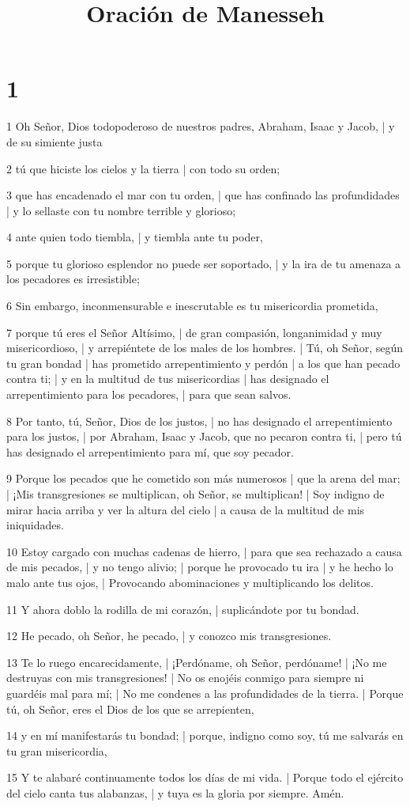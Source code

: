 

\title{Oración de Manesseh}

\chapter{1}

\par 1 Oh Señor, Dios todopoderoso de nuestros padres, Abraham, Isaac y Jacob, | y de su simiente justa
\par 2 tú que hiciste los cielos y la tierra | con todo su orden;
\par 3 que has encadenado el mar con tu orden, | que has confinado las profundidades | y lo sellaste con tu nombre terrible y glorioso;
\par 4 ante quien todo tiembla, | y tiembla ante tu poder,
\par 5 porque tu glorioso esplendor no puede ser soportado, | y la ira de tu amenaza a los pecadores es irresistible;
\par 6 Sin embargo, inconmensurable e inescrutable es tu misericordia prometida,
\par 7 porque tú eres el Señor Altísimo, | de gran compasión, longanimidad y muy misericordioso, | y arrepiéntete de los males de los hombres. | Tú, oh Señor, según tu gran bondad | has prometido arrepentimiento y perdón | a los que han pecado contra ti; | y en la multitud de tus misericordias | has designado el arrepentimiento para los pecadores, | para que sean salvos.
\par 8 Por tanto, tú, Señor, Dios de los justos, | no has designado el arrepentimiento para los justos, | por Abraham, Isaac y Jacob, que no pecaron contra ti, | pero tú has designado el arrepentimiento para mí, que soy pecador.
\par 9 Porque los pecados que he cometido son más numerosos | que la arena del mar; | ¡Mis transgresiones se multiplican, oh Señor, se multiplican! | Soy indigno de mirar hacia arriba y ver la altura del cielo | a causa de la multitud de mis iniquidades.
\par 10 Estoy cargado con muchas cadenas de hierro, | para que sea rechazado a causa de mis pecados, | y no tengo alivio; | porque he provocado tu ira | y he hecho lo malo ante tus ojos, | Provocando abominaciones y multiplicando los delitos.
\par 11 Y ahora doblo la rodilla de mi corazón, | suplicándote por tu bondad.
\par 12 He pecado, oh Señor, he pecado, | y conozco mis transgresiones.
\par 13 Te lo ruego encarecidamente, | ¡Perdóname, oh Señor, perdóname! | ¡No me destruyas con mis transgresiones! | No os enojéis conmigo para siempre ni guardéis mal para mí; | No me condenes a las profundidades de la tierra. | Porque tú, oh Señor, eres el Dios de los que se arrepienten,
\par 14 y en mí manifestarás tu bondad; | porque, indigno como soy, tú me salvarás en tu gran misericordia,
\par 15 Y te alabaré continuamente todos los días de mi vida. | Porque todo el ejército del cielo canta tus alabanzas, | y tuya es la gloria por siempre. Amén.

